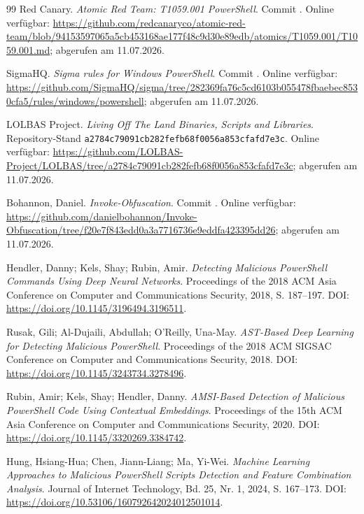 \documentclass[12pt,a4paper,oneside,parskip=half]{scrreprt}
\begin{document}
\begin{thebibliography}{99}
Red Canary. \emph{Atomic Red Team: T1059.001 PowerShell}. Commit . Online verfügbar: \url{https://github.com/redcanaryco/atomic-red-team/blob/94153597065a5cb453168ae177f48c9d30e89edb/atomics/T1059.001/T1059.001.md}; abgerufen am 11.07.2026.

SigmaHQ. \emph{Sigma rules for Windows PowerShell}. Commit . Online verfügbar: \url{https://github.com/SigmaHQ/sigma/tree/282369fa76c5cd6103b055478fbaebec8530cfa5/rules/windows/powershell}; abgerufen am 11.07.2026.

LOLBAS Project. \emph{Living Off The Land Binaries, Scripts and Libraries}. Repository-Stand \texttt{a2784c79091cb282fefb68f0056a853cfafd7e3c}. Online verfügbar: \url{https://github.com/LOLBAS-Project/LOLBAS/tree/a2784c79091cb282fefb68f0056a853cfafd7e3c}; abgerufen am 11.07.2026.

Bohannon, Daniel. \emph{Invoke-Obfuscation}. Commit . Online verfügbar: \url{https://github.com/danielbohannon/Invoke-Obfuscation/tree/f20e7f843edd0a3a7716736e9eddfa423395dd26}; abgerufen am 11.07.2026.

Hendler, Danny; Kels, Shay; Rubin, Amir. \emph{Detecting Malicious PowerShell Commands Using Deep Neural Networks}. Proceedings of the 2018 ACM Asia Conference on Computer and Communications Security, 2018, S. 187--197. DOI: \url{https://doi.org/10.1145/3196494.3196511}.

Rusak, Gili; Al-Dujaili, Abdullah; O'Reilly, Una-May. \emph{AST-Based Deep Learning for Detecting Malicious PowerShell}. Proceedings of the 2018 ACM SIGSAC Conference on Computer and Communications Security, 2018. DOI: \url{https://doi.org/10.1145/3243734.3278496}.

Rubin, Amir; Kels, Shay; Hendler, Danny. \emph{AMSI-Based Detection of Malicious PowerShell Code Using Contextual Embeddings}. Proceedings of the 15th ACM Asia Conference on Computer and Communications Security, 2020. DOI: \url{https://doi.org/10.1145/3320269.3384742}.

Hung, Hsiang-Hua; Chen, Jiann-Liang; Ma, Yi-Wei. \emph{Machine Learning Approaches to Malicious PowerShell Scripts Detection and Feature Combination Analysis}. Journal of Internet Technology, Bd. 25, Nr. 1, 2024, S. 167--173. DOI: \url{https://doi.org/10.53106/160792642024012501014}.


\end{thebibliography}
\end{document}
